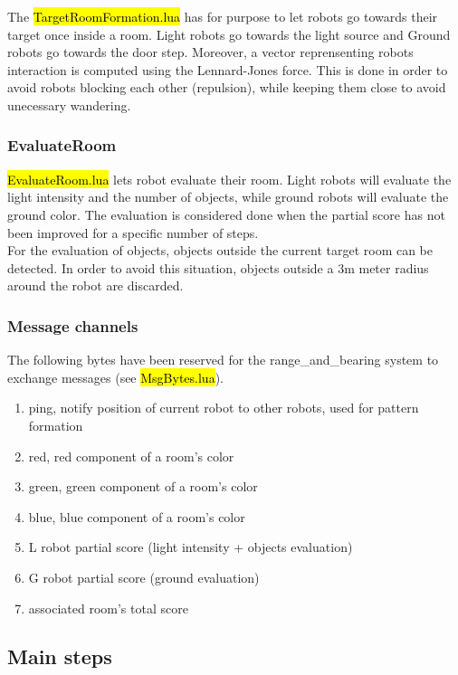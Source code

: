 The \hl{TargetRoomFormation.lua} has for purpose to let robots go towards their
target once inside a room. Light robots go towards the light source and Ground
robots go towards the door step. Moreover, a vector reprensenting robots
interaction is computed using the Lennard-Jones force. This is done in order
to avoid robots blocking each other (repulsion), while keeping them close to
avoid unecessary wandering.

\subsubsection{EvaluateRoom}

\hl{EvaluateRoom.lua} lets robot evaluate their room. Light robots will evaluate
the light intensity and the number of objects, while ground robots will evaluate
the ground color. The evaluation is considered done when the partial score has
not been improved for a specific number of steps.\\

For the evaluation of objects, objects outside the current target room can be
detected. In order to avoid this situation, objects outside a 3m meter radius
around the robot are discarded.

\subsubsection{Message channels}

The following bytes have been reserved for the range\_and\_bearing system to
exchange messages (see \hl{MsgBytes.lua}).

\begin{enumerate}
    \item ping, notify position of current robot to other robots, used for
    pattern formation
    \item red, red component of a room's color
    \item green, green component of a room's color
    \item blue, blue component of a room's color
    \item L robot partial score (light intensity + objects evaluation)
    \item G robot partial score (ground evaluation)
    \item associated room's total score
\end{enumerate}

\subsection{Main steps}

